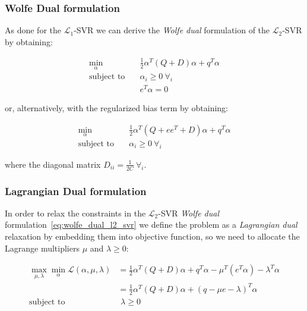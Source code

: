 \subsubsection{Wolfe Dual formulation}

As done for the $\mathcal{L}_1$-SVR we can derive the \emph{Wolfe dual} formulation of the $\mathcal{L}_2$-SVR by obtaining:

\begin{equation} \label{eq:wolfe_dual_l2_svr}
    \begin{aligned}
        \min_{\alpha} \quad & \frac{1}{2} \alpha^T (Q + D) \alpha + q^T \alpha \\
            \text{subject to} \quad & \alpha_i \geq 0 \ \forall_i \\ & e^T \alpha=0
    \end{aligned}
\end{equation}

or, alternatively, with the regularized bias term by obtaining:

\begin{equation} \label{eq:reg_bias_wolfe_dual_l2_svr}
    \begin{aligned}
        \min_{\alpha} \quad & \frac{1}{2}\alpha^T (Q + ee^T + D) \alpha + q^T \alpha \\
            \text{subject to} \quad & \alpha_i \geq 0 \ \forall_i
    \end{aligned}
\end{equation}

where the diagonal matrix $\displaystyle D_{ii} = \frac{1}{2C} \ \forall_i$.

\subsubsection{Lagrangian Dual formulation}

In order to relax the constraints in the $\mathcal{L}_2$-SVR \emph{Wolfe dual} formulation~\eqref{eq:wolfe_dual_l2_svr} we define the problem as a \emph{Lagrangian dual} relaxation by embedding them into objective function, so we need to allocate the Lagrange multipliers $\mu$ and $\lambda \geq 0$:

\begin{equation} \label{eq:l2_svr_lagrangian_dual}
	\begin{aligned}
		    \max_{\mu,\lambda} \min_{\alpha} \mathcal{L}(\alpha,\mu,\lambda) &= \frac{1}{2} \alpha^T (Q+D)\alpha+q^T\alpha - \mu^T (e^T \alpha) - \lambda^T \alpha \\
    &= \frac{1}{2} \alpha^T (Q+D)\alpha + (q - \mu e - \lambda)^T \alpha \\
    \text{subject to} \quad & \,\, \lambda \geq 0
	\end{aligned}
\end{equation}

